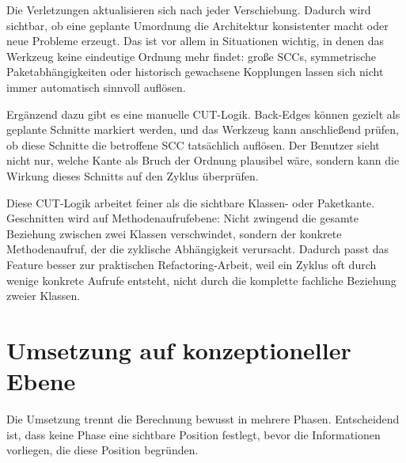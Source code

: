 \documentclass[a4paper,11pt]{article}
\begin{document}
Die Verletzungen aktualisieren sich nach jeder Verschiebung. Dadurch wird
sichtbar, ob eine geplante Umordnung die Architektur konsistenter macht oder
neue Probleme erzeugt. Das ist vor allem in Situationen wichtig, in denen das
Werkzeug keine eindeutige Ordnung mehr findet: gro\ss{}e SCCs, symmetrische
Paketabh\"angigkeiten oder historisch gewachsene Kopplungen lassen sich nicht
immer automatisch sinnvoll aufl\"osen.

Erg\"anzend dazu gibt es eine manuelle CUT-Logik. Back-Edges k\"onnen gezielt
als geplante Schnitte markiert werden, und das Werkzeug kann anschlie\ss{}end
pr\"ufen, ob diese Schnitte die betroffene SCC tats\"achlich aufl\"osen. Der
Benutzer sieht nicht nur, welche Kante als Bruch der Ordnung plausibel w\"are,
sondern kann die Wirkung dieses Schnitts auf den Zyklus \"uberpr\"ufen.

Diese CUT-Logik arbeitet feiner als die sichtbare Klassen- oder Paketkante.
Geschnitten wird auf Methodenaufrufebene: Nicht zwingend die gesamte Beziehung
zwischen zwei Klassen verschwindet, sondern der konkrete Methodenaufruf, der
die zyklische Abh\"angigkeit verursacht. Dadurch passt das Feature besser zur
praktischen Refactoring-Arbeit, weil ein Zyklus oft durch wenige konkrete
Aufrufe entsteht, nicht durch die komplette fachliche Beziehung zweier Klassen.

\section{Umsetzung auf konzeptioneller Ebene}

Die Umsetzung trennt die Berechnung bewusst in mehrere Phasen. Entscheidend
ist, dass keine Phase eine sichtbare Position festlegt, bevor die Informationen
vorliegen, die diese Position begr\"unden.
\end{document}
